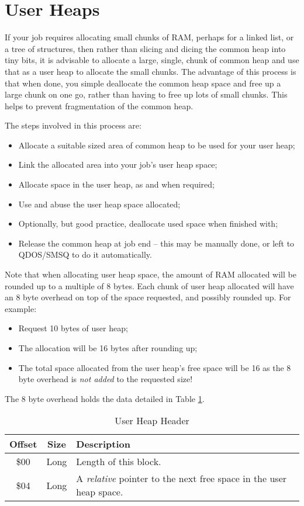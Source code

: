 \section{User Heaps}

If your job requires allocating small chunks of RAM, perhaps for a
linked list, or a tree of structures, then rather than slicing and
dicing the common heap into tiny bits, it is advisable to allocate
a large, single, chunk of common heap and use that as a user heap
to allocate the small chunks. The advantage of this process is that
when done, you simple deallocate the common heap space and free up
a large chunk on one go, rather than having to free up lots of small
chunks. This helps to prevent fragmentation of the common heap.

The steps involved in this process are:
\begin{itemize}
\item Allocate a suitable sized area of common heap to be used for your
user heap;
\item Link the allocated area into your job's user heap space;
\item Allocate space in the user heap, as and when required;
\item Use and abuse the user heap space allocated;
\item Optionally, but good practice, deallocate used space when finished
with;
\item Release the common heap at job end -- this may be manually done,
or left to QDOS/SMSQ to do it automatically.
\end{itemize}
Note that when allocating user heap space, the amount of RAM allocated
will be rounded up to a multiple of 8 bytes. Each chunk of user heap
allocated will have an 8 byte overhead on top of the space requested,
and possibly rounded up. For example:
\begin{itemize}
\item Request 10 bytes of user heap;
\item The allocation will be 16 bytes after rounding up;
\item The total space allocated from the user heap's free space will be
16 as the 8 byte overhead is \emph{not added} to the requested size!
\end{itemize}
The 8 byte overhead holds the data detailed in Table \ref{tab:User-Heap-Header}.

\begin{table}[!h]
\begin{centering}
\begin{tabular}{|c|c|>{\raggedright}p{}|}
\hline 
\textbf{Offset} & \textbf{Size} & \textbf{Description}\tabularnewline
\hline 
\hline 
\$00 & Long & Length of this block.\tabularnewline
\hline 
\$04 & Long & A \emph{relative} pointer to the next free space in the user heap
space.\tabularnewline
\hline 
\end{tabular}
\par\end{centering}
\caption{User Heap Header\label{tab:User-Heap-Header}}
\end{table}

